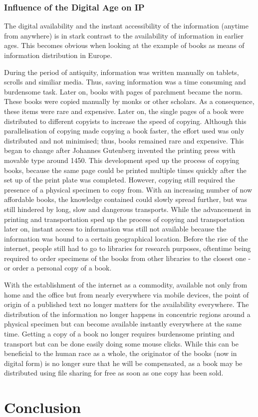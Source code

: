 \documentclass[a4paper]{report}
\begin{document}
\subsection{Influence of the Digital Age on IP}
The digital availability and the instant accessibility of the information (anytime from anywhere) is in stark contrast to the availability of information in earlier ages. This becomes obvious when looking at the example of books as means of information distribution in Europe.

During the period of antiquity, information was written manually on tablets, scrolls and similiar media. Thus, saving information was a time consuming and burdensome task.  Later on, books with pages of parchment became the norm. These books were copied manually by monks or other scholars. As a consequence, these items were rare and expensive. Later on, the single pages of a book were distributed to different copyists to increase the speed of copying. Although this parallelisation of copying made copying a book faster, the effort used was only distributed and not minimised; thus, books remained rare and expensive. This began to change after Johannes Gutenberg invented the printing press with movable type around 1450. This development sped up the process of copying books, because the same page could be printed multiple times quickly after the set up of the print plate was completed. However, copying still required the presence of a physical specimen to copy from. With an increasing number of now affordable books, the knowledge contained could slowly spread further, but was still hindered by long, slow and dangerous transports. While the advancement in printing and transportation sped up the process of copying and transportation later on, instant access to information was still not available because the information was bound to a certain geographical location. Before the rise of the internet, people still had to go to libraries for research purposes, oftentime being required to order specimens of the books from other libraries to the closest one - or order a personal copy of a book.

With the establishment of the internet as a commodity, available not only from home and the office but from nearly everywhere via mobile devices, the point of origin of a published text no longer matters for the availability everywhere. The distribution of the information no longer happens in concentric regions around a physical specimen but can become available instantly everywhere at the same time. Getting a copy of a book no longer requires burdensome printing and transport but can be done easily doing some mouse clicks. While this can be beneficial to the human race as a whole, the originator of the books (now in digital form) is no longer sure that he will be compensated, as a book may be distributed using file sharing for free as soon as one copy has been sold.



\chapter{Conclusion}

\newpage

\printbibliography
\end{document}
